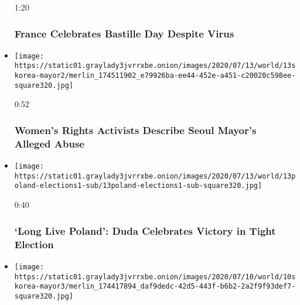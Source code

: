 \begin{itemize}
  1:20

  \hypertarget{france-celebrates-bastille-day-despite-virus}{%
  \subsubsection{France Celebrates Bastille Day Despite
  Virus}\label{france-celebrates-bastille-day-despite-virus}}
\item
  \href{https://www.nytimes3xbfgragh.onion/video/us/100000007236404/seoul-mayor-abuse-sexual-harassment.html?action=click\&module=video-series-bar\&region=header\&pgtype=Article\&playlistId=video/world}{}

  \texttt{[image: https://static01.graylady3jvrrxbe.onion/images/2020/07/13/world/13skorea-mayor2/merlin\_174511902\_e79926ba-ee44-452e-a451-c20020c598ee-square320.jpg]}

  0:52

  \hypertarget{womens-rights-activists-describe-seoul-mayors-alleged-abuse}{%
  \subsubsection{Women's Rights Activists Describe Seoul Mayor's Alleged
  Abuse}\label{womens-rights-activists-describe-seoul-mayors-alleged-abuse}}
\item
  \href{https://www.nytimes3xbfgragh.onion/video/world/europe/100000007236353/poland-election-duda-victory-speech.html?action=click\&module=video-series-bar\&region=header\&pgtype=Article\&playlistId=video/world}{}

  \texttt{[image: https://static01.graylady3jvrrxbe.onion/images/2020/07/13/world/13poland-elections1-sub/13poland-elections1-sub-square320.jpg]}

  0:40

  \hypertarget{long-live-poland-duda-celebrates-victory-in-tight-election}{%
  \subsubsection{`Long Live Poland': Duda Celebrates Victory in Tight
  Election}\label{long-live-poland-duda-celebrates-victory-in-tight-election}}
\item
  \href{https://www.nytimes3xbfgragh.onion/video/us/100000007233462/seoul-officials-read-mayor-note.html?action=click\&module=video-series-bar\&region=header\&pgtype=Article\&playlistId=video/world}{}

  \texttt{[image: https://static01.graylady3jvrrxbe.onion/images/2020/07/10/world/10skorea-mayor3/merlin\_174417894\_daf9dedc-42d5-443f-b6b2-2a2f9f93def7-square320.jpg]}


\end{itemize}
